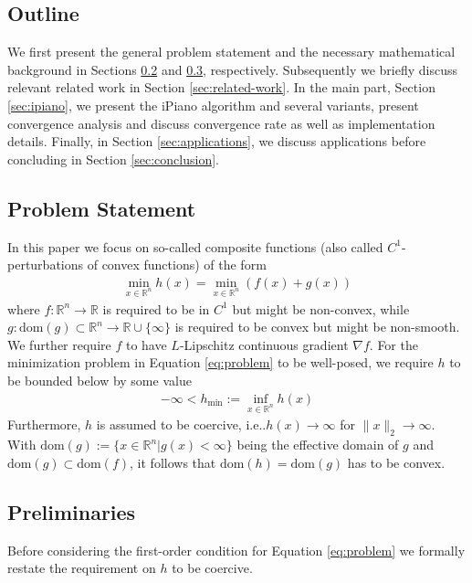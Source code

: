 \documentclass[onecolumn,final,a4paper,13pt,reqno]{siamart}
\makeatletter
\DeclareRobustCommand\onedot{\futurelet\@let@token\@onedot}
\def\@onedot{\ifx\@let@token.\else.\null\fi\xspace}
\def\ie{{i.e}\onedot} \def\Ie{{I.e}\onedot}
\def\dom{\text{dom}}
\makeatother
\begin{document}
\subsection{Outline} We first present the general problem statement and the necessary mathematical background in Sections \ref{subsec:problem} and \ref{subsec:preliminaries}, respectively. Subsequently we briefly discuss relevant related work in Section \ref{sec:related-work}. In the main part, Section \ref{sec:ipiano}, we present the iPiano algorithm and several variants, present convergence analysis and discuss convergence rate as well as implementation details. Finally, in Section \ref{sec:applications}, we discuss applications before concluding in Section \ref{sec:conclusion}.

\subsection{Problem Statement}
\label{subsec:problem}

In this paper we focus on so-called composite functions (also called $C^1$-perturbations of convex functions) of the form
\begin{align}
	\min_{x \in \mathbb{R}^n} h(x) = \min_{x \in \mathbb{R}^n} (f(x) + g(x))\label{eq:problem}
\end{align}
where $f : \mathbb{R}^n \rightarrow \mathbb{R}$ is required to be in $C^1$ but might be non-convex, while $g : \dom(g) \subset \mathbb{R}^n \rightarrow \mathbb{R} \cup \{\infty\}$ is required to be convex but might be non-smooth. We further require $f$ to have $L$-Lipschitz continuous gradient $\nabla f$. For the minimization problem in Equation \eqref{eq:problem} to be well-posed, we require $h$ to be bounded below by some value
\begin{align}
	-\infty < h_{\min} := \inf _{x \in \mathbb{R}^n} h(x)
\end{align}
Furthermore, $h$ is assumed to be coercive, \ie $h(x) \rightarrow \infty$ for $\|x\|_2 \rightarrow \infty$. With $\dom(g) := \{x \in \mathbb{R}^n | g(x) < \infty\}$ being the effective domain of $g$ and $\dom(g) \subset \dom(f)$, it follows that $\dom(h) = \dom(g)$ has to be convex.

\subsection{Preliminaries}
\label{subsec:preliminaries}

Before considering the first-order condition for Equation \eqref{eq:problem} we formally restate the requirement on $h$ to be coercive.
\end{document}
